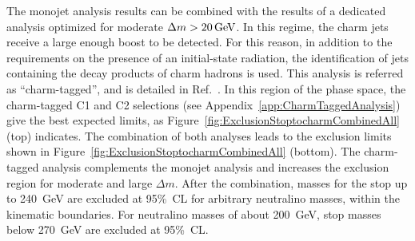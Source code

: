 The monojet analysis results can be combined with the results of a dedicated analysis optimized for moderate $\Delta m \gt \unit[20]{GeV}$.
In this regime, the charm jets receive a large enough boost to be detected.
For this reason, in addition to the requirements on the presence of an initial-state radiation, the identification of jets containing the decay products of charm hadrons is used.
This analysis is referred as ``charm-tagged'', and is detailed in Ref.~\cite{Aad:2014nra}.
In this region of the phase space, the charm-tagged C1 and C2 selections (see Appendix~\ref{app:CharmTaggedAnalysis}) give the best expected limits, as Figure~\ref{fig:ExclusionStoptocharmCombinedAll} (top) indicates.
The combination of both analyses leads to the exclusion limits shown in Figure~\ref{fig:ExclusionStoptocharmCombinedAll} (bottom).
The charm-tagged analysis complements the monojet analysis and increases the exclusion region for moderate and large $\Delta m$.
After the combination, masses for the stop up to 240~GeV are excluded at 95\%~CL for arbitrary neutralino masses, within the kinematic boundaries.
For neutralino masses of about 200~GeV, stop masses below 270~GeV are excluded at 95\%~CL.

